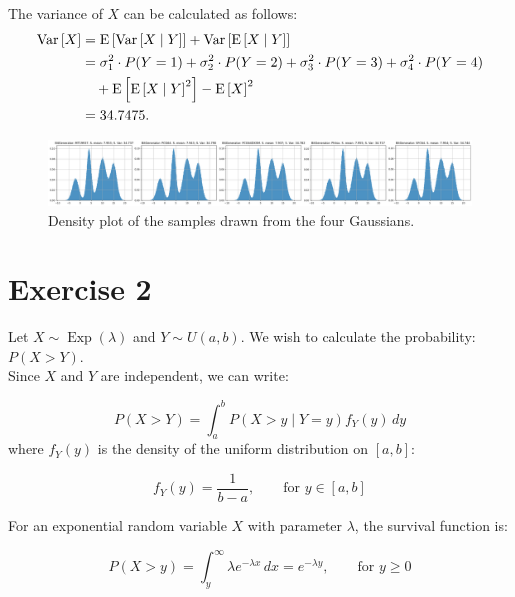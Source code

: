 \documentclass[a4paper,12pt]{article}
\renewenvironment{equation}
{\setlength{\mathindent}{0cm}%
  \begin{equation*}%
  }
  {
\end{equation*}}
\begin{document}
The variance of \(X\) can be calculated as follows:
\begin{equation}
  \begin{split}
    \operatorname{Var}\left[X\right] &= \operatorname{E}\left[\operatorname{Var}\left[X \mid Y\right]\right] + \operatorname{Var}\left[\operatorname{E}\left[X \mid Y\right]\right] \\
    &= \sigma^2_1 \cdot P(Y=1) + \sigma^2_2 \cdot P(Y=2) + \sigma^2_3 \cdot P(Y=3) + \sigma^2_4 \cdot P(Y=4) \\
    &\quad + \operatorname{E}\left[\operatorname{E}\left[X \mid Y\right]^2\right] - \operatorname{E}\left[X\right]^2 \\
    &= 34.7475.
  \end{split}
\end{equation}

\begin{figure}[H]
  \centering
  \includegraphics[width=1\textwidth]{ex1-plot.png}
  \caption{Density plot of the samples drawn from the four Gaussians.}
\end{figure}

\section*{Exercise 2}

Let \(X \sim \operatorname{Exp}(\lambda)\) and \(Y \sim U(a,b)\). We wish to calculate the probability: $P(X > Y)$.\\

Since \(X\) and \(Y\) are independent, we can write:

\begin{equation}
  P(X > Y) = \int_a^b P(X > y \mid Y = y) f_Y(y) \, dy
\end{equation}
where \(f_Y(y)\) is the density of the uniform distribution on \([a,b]\):

\begin{equation}
  f_Y(y) = \frac{1}{b-a}, \qquad \text{for } y \in [a,b]
\end{equation}

For an exponential random variable \(X\) with parameter \(\lambda\), the survival function is:

\begin{equation}
  P(X > y) = \int_y^\infty \lambda e^{-\lambda x} \, dx = e^{-\lambda y}, \qquad \text{for } y \ge 0
\end{equation}
\end{document}
